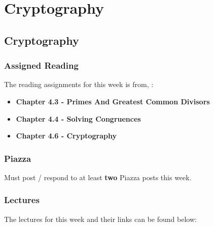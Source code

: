 \clearpage

\renewcommand{\ChapTitle}{Cryptography}
\renewcommand{\SectionTitle}{Cryptography}

\chapter{\ChapTitle}
\section{\SectionTitle}

\subsection{Assigned Reading}

The reading assignments for this week is from, \Textbook:

\begin{itemize}
    \item \textbf{Chapter 4.3 - Primes And Greatest Common Divisors}
    \item \textbf{Chapter 4.4 - Solving Congruences}
    \item \textbf{Chapter 4.6 - Cryptography}
\end{itemize}

\subsection{Piazza}

Must post / respond to at least \textbf{two} Piazza posts this week.

\subsection{Lectures}

The lectures for this week and their links can be found below:

